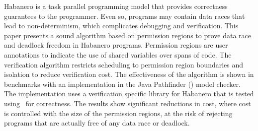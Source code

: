 Habanero is a task parallel programming model that provides correctness
guarantees to the programmer.  Even so, programs may contain data
races that lead to non-determinism, which complicates
debugging and verification. This paper presents a sound algorithm based on
permission regions to prove data race and deadlock freedom in
Habanero programs. Permission regions are user annotations to indicate
the use of shared variables over spans of code. The verification
algorithm restricts scheduling to permission region boundaries
and isolation to reduce verification cost.  The effectiveness of the algorithm is shown in
benchmarks with an implementation in the Java
Pathfinder (\jpf) model checker. The implementation uses a
verification specific library for Habanero that is tested using \jpf\ for correctness. The
results show significant reductions in cost, where cost is controlled
with the size of the permission regions, at the risk of rejecting
programs that are actually free of any data race or deadlock.
